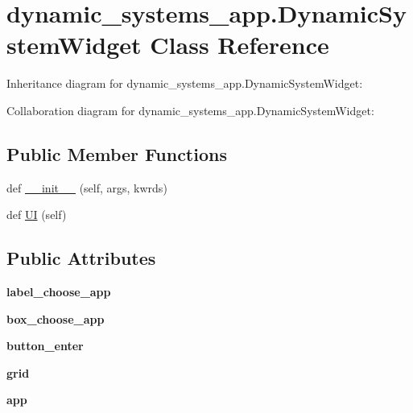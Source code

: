 \hypertarget{classdynamic__systems__app_1_1DynamicSystemWidget}{}\section{dynamic\+\_\+systems\+\_\+app.\+Dynamic\+System\+Widget Class Reference}
\label{classdynamic__systems__app_1_1DynamicSystemWidget}


Inheritance diagram for dynamic\+\_\+systems\+\_\+app.\+Dynamic\+System\+Widget\+:


Collaboration diagram for dynamic\+\_\+systems\+\_\+app.\+Dynamic\+System\+Widget\+:
\subsection*{Public Member Functions}
\begin{DoxyCompactItemize}
\item 
def \hyperlink{classdynamic__systems__app_1_1DynamicSystemWidget_a63e37c716046f650aeed787219bb708d}{\+\_\+\+\_\+init\+\_\+\+\_\+} (self, args, kwrds)
\item 
def \hyperlink{classdynamic__systems__app_1_1DynamicSystemWidget_a4a9ba786a3c93fac5257c0dc2c984e43}{UI} (self)
\end{DoxyCompactItemize}
\subsection*{Public Attributes}
\begin{DoxyCompactItemize}
\item 
\mbox{\label{classdynamic__systems__app_1_1DynamicSystemWidget_ac53c665d622c267b80edc836fb6f022e}} 
{\bfseries label\+\_\+choose\+\_\+app}
\item 
\mbox{\label{classdynamic__systems__app_1_1DynamicSystemWidget_aa5884177e5ab9796ec9ea9db4a29e10a}} 
{\bfseries box\+\_\+choose\+\_\+app}
\item 
\mbox{\label{classdynamic__systems__app_1_1DynamicSystemWidget_a06b2ee99ee4a96ebcac0ffea12a6345a}} 
{\bfseries button\+\_\+enter}
\item 
\mbox{\label{classdynamic__systems__app_1_1DynamicSystemWidget_ab0bd1a293c66f35ef1022df1ed5da685}} 
{\bfseries grid}
\item 
\mbox{\label{classdynamic__systems__app_1_1DynamicSystemWidget_a25578de7518b7e418ab14bdce6dae8d4}} 
{\bfseries app}
\end{DoxyCompactItemize}


